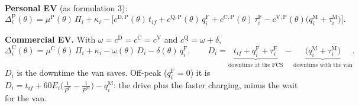 \documentclass[12pt,a4paper]{article}
\begin{document}
\textbf{Personal EV} (as formulation 3):
\[
\Delta^{\mathrm P}_i(\theta)=\mu^{\mathrm P}(\theta)\,\Pi_i+\kappa_i-\Big[c^{\mathrm D,\mathrm P}(\theta)\,t_{if}+c^{\mathrm Q,\mathrm P}(\theta)\,q^{\mathrm F}_i+c^{\mathrm C,\mathrm P}(\theta)\,\tau^{\mathrm F}_i-c^{\mathrm V,\mathrm P}(\theta)\big(q^{\mathrm M}_i+\tau^{\mathrm M}_i\big)\Big].
\]

\textbf{Commercial EV.} With $\omega=c^{\mathrm D}=c^{\mathrm C}=c^{\mathrm V}$ and $c^{\mathrm Q}=\omega+\delta$,
\[
\Delta^{\mathrm C}_i(\theta)=\mu^{\mathrm C}(\theta)\,\Pi_i+\kappa_i-\omega(\theta)\,D_i-\delta(\theta)\,q^{\mathrm F}_i,\qquad
D_i=\underbrace{t_{if}+q^{\mathrm F}_i+\tau^{\mathrm F}_i}_{\text{downtime at the FCS}}-\underbrace{\big(q^{\mathrm M}_i+\tau^{\mathrm M}_i\big)}_{\text{downtime with the van}} .
\]
$D_i$ is the downtime the van saves. Off-peak ($q^{\mathrm F}_i=0$) it is $D_i=t_{if}+60E_i\big(\tfrac1{P^{\mathrm F}}-\tfrac1{P^{\mathrm M}}\big)-q^{\mathrm M}_i$: the drive plus the faster charging, minus the wait for the van.
\end{document}
